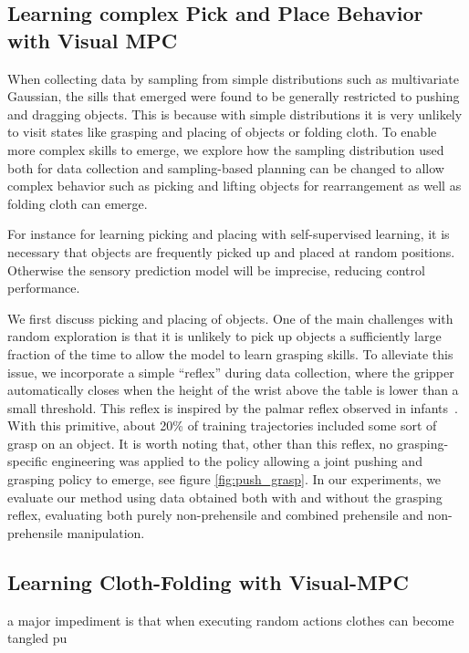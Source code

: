 \subsection{Learning complex Pick and Place Behavior with Visual MPC}
\label{subsec:pickplace_data}
When collecting data by sampling from simple distributions such as multivariate Gaussian, the sills that emerged were found to be generally restricted to pushing and dragging objects. This is because with simple distributions it is very unlikely to visit  states like grasping and placing of objects or folding cloth. To enable more complex skills to emerge, we explore how the sampling distribution used both for data collection and sampling-based planning can be changed to allow complex behavior such as picking and lifting objects for rearrangement as well as folding cloth can emerge. 

For instance for learning picking and placing with self-supervised learning, it is necessary that objects are frequently picked up and placed at random positions.  Otherwise the sensory prediction model will be imprecise, reducing control performance.  

We first discuss picking and placing of objects. One of the main challenges with random exploration is that it is unlikely to pick up objects a sufficiently large fraction of the time to allow the model to learn grasping skills. To alleviate this issue, we incorporate a simple ``reflex'' during data collection, where the gripper automatically closes when the height of the wrist above the table is lower than a small threshold. This reflex is inspired by the palmar reflex observed in infants~\cite{grasping_fetal}. With this primitive, about 20\% of training trajectories included some sort of grasp on an object. It is worth noting that, other than this reflex, no grasping-specific engineering was applied to the policy allowing a joint pushing and grasping policy to emerge, see figure \ref{fig:push_grasp}. In our experiments, we evaluate our method using data obtained both with and without the grasping reflex, evaluating both purely non-prehensile and combined prehensile and non-prehensile manipulation.

\subsection{Learning Cloth-Folding with Visual-MPC}
\label{subsec:cloth_folding_data}
 a major impediment is that when executing random actions clothes can become tangled pu

